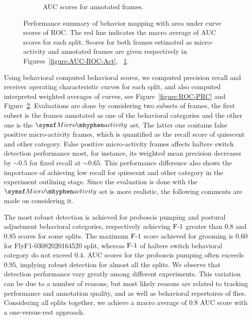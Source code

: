 \begin{figure}[htb!]
\begin{subfigure}[b]{0.5\linewidth}
		\caption{AUC scores for annotated frames. \label{figure:AUC-ROC-Ann}}
	\end{subfigure}%
	\caption[Performance summary of behavior mapping with area under curve scores of ROC.]
	{Performance summary of behavior mapping with area under curve scores of ROC.
		The red line indicates the macro average of AUC scores for each split.
		Scores for both frames estimated as micro-activity and annotated frames are given respectively in Figures~\ref{figure:AUC-ROC-Act}, ~\ref{figure:AUC-ROC-Ann}.
		\label{figure:AUC}}

\end{figure}

Using behavioral computed behavioral scores, we computed precision recall and receiver operating characteristic curves for each split, and also computed interpreted weighted averages of curves, see Figure~\ref{figure:ROC-PRC} and Figure~\ref{figure:AUC}.
Evaluations are done by considering two subsets of frames, the first subset is the frames annotated as one of the behavioral categories and the other one is the $\MicroActivity$ set.
The latter one contains false positive micro-activity frames, which is quantified as the recall score of quiescent and other category.
False positive micro-activity frames affects haltere switch detection performance most, for instance, its weighted mean precision decreases by ${\sim}0.5$ for fixed recall at ${\sim}0.65$.
This performance difference also shows the importance of achieving low recall for quiescent and other category in the experiment outlining stage.
Since the evaluation is done with the $\MicroActivity$ set is more realistic, the following comments are made on considering it.

The most robust detection is achieved for proboscis pumping and postural adjustment behavioral categories, respectively achieving $\textnormal{F-}1$ greater than $0.8$ and $0.85$ scores for some splits.
The maximum $\textnormal{F-}1$ score achieved for grooming is $0.60$ for FlyF1-03082020164520 split, whereas $\textnormal{F-}1$ of haltere switch behavioral category do not exceed $0.4$.
AUC scores for the proboscis pumping often exceeds $0.95$, implying robust detection for almost all the splits.
We observe that detection performance vary greatly among different experiments. This variation can be due to a number of reasons, but most likely reasons are related to tracking performance and annotation quality, and as well as behavioral repertoires of flies.
Considering all splits together, we achieve a macro average of $0.8$ AUC score with a one-versus-rest approach.

